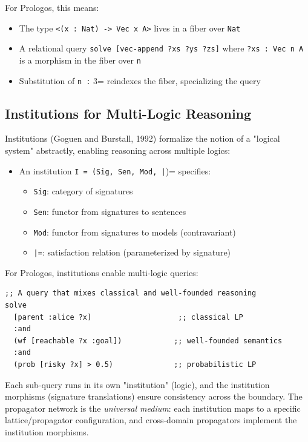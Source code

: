 \documentclass[11pt]{article}
\begin{document}
For Prologos, this means:
\begin{itemize}
\item The type \texttt{<(x : Nat) -> Vec x A>} lives in a fiber over \texttt{Nat}
\item A relational query \texttt{solve [vec-append ?xs ?ys ?zs]} where \texttt{?xs : Vec n A}
is a morphism in the fiber over \texttt{n}
\item Substitution of \texttt{n :} 3= reindexes the fiber, specializing the query
\end{itemize}
\subsection{Institutions for Multi-Logic Reasoning}
\label{sec:org92903c2}

Institutions (Goguen and Burstall, 1992) formalize the notion of a "logical
system" abstractly, enabling reasoning across multiple logics:

\begin{itemize}
\item An institution \texttt{I = (Sig, Sen, Mod, |})= specifies:
\begin{itemize}
\item \texttt{Sig}: category of signatures
\item \texttt{Sen}: functor from signatures to sentences
\item \texttt{Mod}: functor from signatures to models (contravariant)
\item \texttt{|=}: satisfaction relation (parameterized by signature)
\end{itemize}
\end{itemize}

For Prologos, institutions enable multi-logic queries:

\begin{verbatim}
;; A query that mixes classical and well-founded reasoning
solve
  [parent :alice ?x]                    ;; classical LP
  :and
  (wf [reachable ?x :goal])            ;; well-founded semantics
  :and
  (prob [risky ?x] > 0.5)              ;; probabilistic LP
\end{verbatim}

Each sub-query runs in its own "institution" (logic), and the institution
morphisms (signature translations) ensure consistency across the boundary.
The propagator network is the \emph{universal medium}: each institution maps to
a specific lattice/propagator configuration, and cross-domain propagators
implement the institution morphisms.
\end{document}
